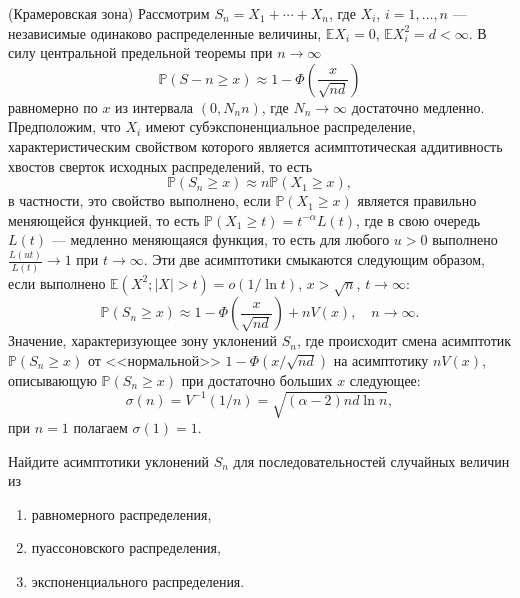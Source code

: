 \begin{problem}(Крамеровская зона)
Рассмотрим $S_n = X_1+\cdots+X_n$, где $X_i$, $i=1,\dots,n$ --- независимые одинаково распределенные величины, $\mathbb{E}X_i=0$, $\mathbb{E}X_i^2= d<\infty$.
В силу центральной предельной теоремы при $n\to\infty$ 
\[
\mathbb{P}(S-n\geq x)\approx 1- \Phi\left(\frac{x}{\sqrt{nd}}\right)
\]
равномерно по $x$ из интервала $(0,N_{n}n)$, где $N_n\to \infty$ достаточно медленно. Предположим, что $X_i$ имеют субэкспоненциальное распределение, характеристическим свойством которого является асимптотическая аддитивность хвостов сверток исходных распределений, то есть 
\[
\mathbb{P}(S_n\geq x)\approx n\mathbb{P}(X_1\geq x),
\]
в частности, это свойство выполнено, если $\mathbb{P}(X_1\geq x)$ является правильно меняющейся функцией, то есть $\mathbb{P}(X_1\geq t) = t^{-\alpha}L(t)$, где в свою очередь $L(t)$ --- медленно меняющаяся функция, то есть для любого $u>0$ выполнено $\frac{L(ut)}{L(t)}\to 1$ при $t\to\infty$.
Эти две асимптотики смыкаются следующим образом, если выполнено $\mathbb{E}(X^2;|X|>t)={o}(1/\ln t)$, $x>\sqrt{n}$, $t\to\infty$:
\[
\mathbb{P}(S_n\geq x)\approx 1- \Phi\left(\frac{x}{\sqrt{nd}}\right)+nV(x),\quad n\to\infty.
\]
Значение, характеризующее зону уклонений $S_n$, где происходит смена асимптотик $\mathbb{P}(S_n\geq x)$ от <<нормальной>> $1-\Phi(x/\sqrt{nd})$ на асимптотику $nV(x)$, описывающую $\mathbb{P}(S_n\geq x)$ при достаточно больших $x$ следующее:
\[
\sigma(n) = V^{-1}(1/n) = \sqrt{(\alpha-2)nd\ln n},
\]
при $n=1$ полагаем $\sigma(1)=1$.

Найдите асимптотики уклонений $S_n$ для последовательностей случайных величин из \begin{enumerate}
\item равномерного распределения,
\item пуассоновского распределения,
\item экспоненциального распределения.
\end{enumerate}

\end{problem}
